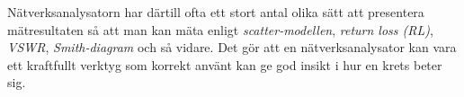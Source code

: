 Nätverksanalysatorn har därtill ofta ett stort antal olika sätt att presentera
mätresultaten så att man kan mäta enligt \emph{scatter-modellen},
\emph{return loss (RL)}, \emph{VSWR}, \emph{Smith-diagram} och så vidare.
Det gör att en nätverksanalysator kan vara ett kraftfullt verktyg som korrekt
använt kan ge god insikt i hur en krets beter sig.
